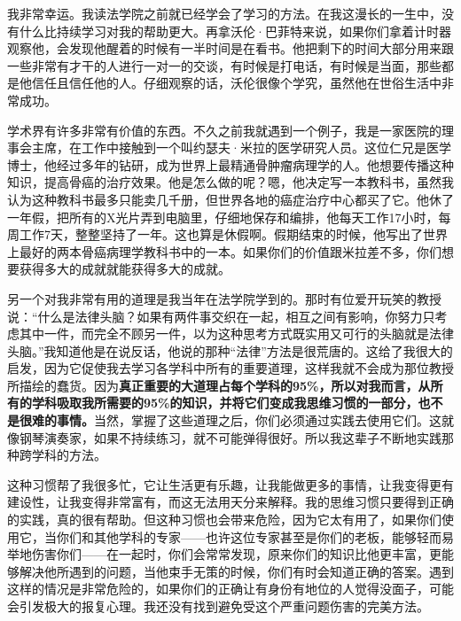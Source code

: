我非常幸运。我读法学院之前就已经学会了学习的方法。在我这漫长的一生中，没有什么比持续学习对我的帮助更大。再拿沃伦·巴菲特来说，如果你们拿着计时器观察他，会发现他醒着的时候有一半时间是在看书。他把剩下的时间大部分用来跟一些非常有才干的人进行一对一的交谈，有时候是打电话，有时候是当面，那些都是他信任且信任他的人。仔细观察的话，沃伦很像个学究，虽然他在世俗生活中非常成功。
\par

学术界有许多非常有价值的东西。不久之前我就遇到一个例子，我是一家医院的理事会主席，在工作中接触到一个叫约瑟夫·米拉的医学研究人员。这位仁兄是医学博士，他经过多年的钻研，成为世界上最精通骨肿瘤病理学的人。他想要传播这种知识，提高骨癌的治疗效果。他是怎么做的呢？嗯，他决定写一本教科书，虽然我认为这种教科书最多只能卖几千册，但世界各地的癌症治疗中心都买了它。他休了一年假，把所有的X光片弄到电脑里，仔细地保存和编排，他每天工作17小时，每周工作7天，整整坚持了一年。这也算是休假啊。假期结束的时候，他写出了世界上最好的两本骨癌病理学教科书中的一本。如果你们的价值跟米拉差不多，你们想要获得多大的成就就能获得多大的成就。
\par

另一个对我非常有用的道理是我当年在法学院学到的。那时有位爱开玩笑的教授说：“什么是法律头脑？如果有两件事交织在一起，相互之间有影响，你努力只考虑其中一件，而完全不顾另一件，以为这种思考方式既实用又可行的头脑就是法律头脑。”我知道他是在说反话，他说的那种“法律”方法是很荒唐的。这给了我很大的启发，因为它促使我去学习各学科中所有的重要道理，这样我就不会成为那位教授所描绘的蠢货。因为\textbf{真正重要的大道理占每个学科的95\%，所以对我而言，从所有的学科吸取我所需要的95\%的知识，并将它们变成我思维习惯的一部分，也不是很难的事情。}当然，掌握了这些道理之后，你们必须通过实践去使用它们。这就像钢琴演奏家，如果不持续练习，就不可能弹得很好。所以我这辈子不断地实践那种跨学科的方法。
\par

这种习惯帮了我很多忙，它让生活更有乐趣，让我能做更多的事情，让我变得更有建设性，让我变得非常富有，而这无法用天分来解释。我的思维习惯只要得到正确的实践，真的很有帮助。但这种习惯也会带来危险，因为它太有用了，如果你们使用它，当你们和其他学科的专家——也许这位专家甚至是你们的老板，能够轻而易举地伤害你们——在一起时，你们会常常发现，原来你们的知识比他更丰富，更能够解决他所遇到的问题，当他束手无策的时候，你们有时会知道正确的答案。遇到这样的情况是非常危险的，如果你们的正确让有身份有地位的人觉得没面子，可能会引发极大的报复心理。我还没有找到避免受这个严重问题伤害的完美方法。
\par

